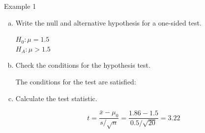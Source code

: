 \documentclass[fleqn, 10pt]{beamer}\usepackage[]{graphicx}\usepackage[]{color}
\begin{document}
\begin{frame}{Example 1}
\begin{enumerate}[(a)]
\item Write the null and alternative hypothesis for a one-sided test.

\medskip
{\color{blue} $H_0: \mu = 1.5$\\
$H_A: \mu > 1.5$}
\smallskip

\item Check the conditions for the hypothesis test.

\medskip
{\color{blue} The conditions for the test are satisfied:}\\
\smallskip

\item Calculate the test statistic.

{\color{blue}
$$t = \frac{\bar{x} - \mu_0}{s / \sqrt{n}} = 
\frac{1.86 - 1.5}{0.5 / \sqrt{20}} = 3.22$$
}
\end{enumerate}
\end{frame}
\end{document}

